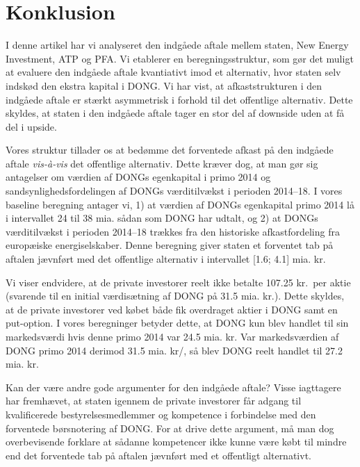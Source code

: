 \documentclass{article}
\begin{document}
\FloatBarrier

\section{Konklusion}

I denne artikel har vi analyseret den indgåede aftale mellem staten, New Energy Investment, ATP og PFA. Vi etablerer en beregningsstruktur, som gør det muligt at evaluere den indgåede aftale kvantiativt imod et alternativ, hvor staten selv indskød den ekstra kapital i DONG. Vi har vist, at afkaststrukturen i den indgåede aftale er stærkt asymmetrisk i forhold til det offentlige alternativ. Dette skyldes, at staten i den indgåede aftale tager en stor del af downside uden at få del i upside. 

Vores struktur tillader os at bedømme det forventede afkast på den indgåede aftale \emph{vis-\`{a}-vis} det offentlige alternativ. Dette kræver dog, at man gør sig antagelser om værdien af DONGs egenkapital i primo 2014 og sandsynlighedsfordelingen af DONGs  værditilvækst i perioden 2014--18. I vores baseline beregning antager vi, 1) at værdien af DONGs egenkapital primo 2014 lå i intervallet 24 til 38 mia. sådan som DONG har udtalt, og 2) at DONGs  værditilvækst i perioden 2014--18 trækkes fra den historiske afkastfordeling fra europæiske energiselskaber. Denne beregning giver staten et forventet tab på aftalen jævnført med det offentlige alternativ i intervallet [1.6; 4.1] mia. kr. 

Vi viser endvidere, at de private investorer reelt ikke betalte 107.25 kr.\ per aktie (svarende til en initial værdisætning af DONG på 31.5 mia. kr.). Dette skyldes, at de private investorer ved købet både fik overdraget  aktier i DONG samt en put-option. I vores beregninger betyder dette, at DONG kun blev handlet til sin markedsværdi hvis denne primo 2014 var 24.5 mia. kr. Var markedsværdien af DONG primo 2014 derimod 31.5 mia. kr/, så blev DONG reelt handlet til 27.2 mia. kr.


Kan der være andre gode argumenter for den indgåede aftale? Visse iagttagere har fremhævet, at staten igennem de private investorer får adgang til kvalificerede bestyrelsesmedlemmer og kompetence i forbindelse med den forventede børsnotering af DONG. For at drive dette argument, må man dog overbevisende forklare at sådanne kompetencer ikke kunne være købt til mindre end  det forventede tab på aftalen jævnført med et offentligt alternativt. %
\end{document}
